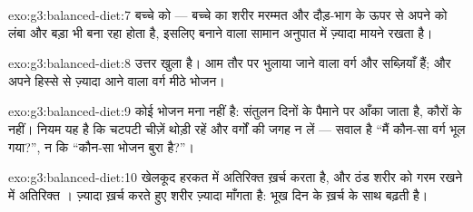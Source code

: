 \begin{solution}{exo:g3:balanced-diet:7}
बच्चे को --- बच्चे का शरीर मरम्मत और दौड़-भाग के ऊपर से अपने को लंबा
और बड़ा भी बना रहा होता है, इसलिए बनाने वाला सामान अनुपात में ज़्यादा
मायने रखता है।
\end{solution}

\begin{solution}{exo:g3:balanced-diet:8}
उत्तर खुला है। आम तौर पर भुलाया जाने वाला वर्ग  और सब्ज़ियाँ हैं; और
अपने हिस्से से ज़्यादा आने वाला वर्ग मीठे भोजन।
\end{solution}

\begin{solution}{exo:g3:balanced-diet:9}
कोई भोजन मना नहीं है: संतुलन दिनों के पैमाने पर आँका जाता है, कौरों के
नहीं। नियम यह है कि चटपटी चीज़ें थोड़ी रहें और वर्गों की जगह न लें ---
सवाल है ``मैं कौन-सा वर्ग भूल गया?'', न कि ``कौन-सा भोजन बुरा है?''।
\end{solution}

\begin{solution}{exo:g3:balanced-diet:10}
खेलकूद हरकत में अतिरिक्त  ख़र्च करता है, और ठंड शरीर को गरम रखने
में अतिरिक्त । ज़्यादा ख़र्च करते हुए शरीर ज़्यादा माँगता है: भूख
दिन के ख़र्च के साथ बढ़ती है।
\end{solution}
